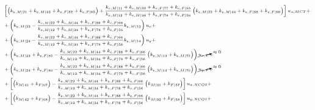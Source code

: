 \begin{equation}\label{paperA:eq:syseqs03}
\scriptsize
\begin{split}
&\left[\left(k_{e,M|21}+k_{e,M|43}+k_{e,F|87}+k_{e,F|65}\right)+\frac{k_{e,M|11}+k_{e,M|33}+k_{e,F|77}+k_{e,F|55}}{k_{e,M|12}+k_{e,M|34}+k_{e,F|78}+k_{e,F|56}}\left(k_{e,M|22}+k_{e,M|44}+k_{e,F|88}+k_{e,F|66}\right)\right]u_{x,MCT}+\\
&+\left(k_{e,M|23}-\frac{k_{e,M|22}+k_{e,M|44}+k_{e,F|88}+k_{e,F|66}}{k_{e,M|12}+k_{e,M|34}+k_{e,F|78}+k_{e,F|56}}k_{e,M|13}\right)u_{x}+\\
&+\left(k_{e,M|24}-\frac{k_{e,M|22}+k_{e,M|44}+k_{e,F|88}+k_{e,F|66}}{k_{e,M|12}+k_{e,M|34}+k_{e,F|78}+k_{e,F|56}}k_{e,M|14}\right)u_{y}+\\
&+\left(k_{e,M|23}+k_{e,F|85}-\frac{k_{e,M|22}+k_{e,M|44}+k_{e,F|88}+k_{e,F|66}}{k_{e,M|12}+k_{e,M|34}+k_{e,F|78}+k_{e,F|56}}\left(k_{e,M|13}+k_{e,M|75}\right)\right)\cancelto{\approx 0}{u_{x,F}}+\\
&+\left(k_{e,M|24}+k_{e,F|86}-\frac{k_{e,M|22}+k_{e,M|44}+k_{e,F|88}+k_{e,F|66}}{k_{e,M|12}+k_{e,M|34}+k_{e,F|78}+k_{e,F|56}}\left(k_{e,M|14}+k_{e,M|76}\right)\right)\cancelto{\approx 0}{u_{y,F}}+\\
&+\left[\left(k_{M|41}+k_{F|67}\right)-\frac{k_{e,M|22}+k_{e,M|44}+k_{e,F|88}+k_{e,F|66}}{k_{e,M|12}+k_{e,M|34}+k_{e,F|78}+k_{e,F|56}}\left(k_{M|31}+k_{F|57}\right)\right]u_{x,NCOI}+\\
&+\left[\left(k_{M|42}+k_{F|68}\right)-\frac{k_{e,M|22}+k_{e,M|44}+k_{e,F|88}+k_{e,F|66}}{k_{e,M|12}+k_{e,M|34}+k_{e,F|78}+k_{e,F|56}}\left(k_{M|32}+k_{F|58}\right)\right]u_{y,NCOI}+\\

\end{split}
\end{equation}
